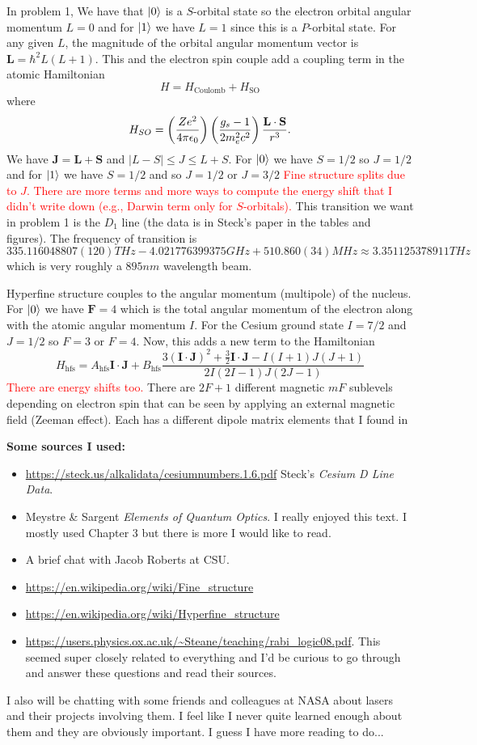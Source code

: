 \documentclass[12pt]{article} %
\begin{document}
In problem 1, We have that $\ket{0}$ is a $S$-orbital state so the electron orbital angular momentum $L=0$ and for $\ket{1}$ we have $L=1$ since this is a $P$-orbital state. For any given $L$, the magnitude of the orbital angular momentum vector is $\mathbf{L}=\hbar^2 L(L+1)$. This and the electron spin couple add a coupling term in the atomic Hamiltonian
\[
H=H_{\textrm{Coulomb}}+H_{\textrm{SO}}
\]
where
\[
H_{SO} = \left(\frac{Ze^2}{4 \pi \epsilon_0} \right) \left(\frac{g_s-1}{2m_e^2c^2} \right)\frac{\bf{L}\cdot \bf{S}}{r^3}.
\]
We have $\mathbf{J} = \mathbf{L}+\mathbf{S}$ and $|L-S|\leq J \leq L+S$. For $\ket{0}$ we have $S=1/2$ so $J=1/2$ and for $\ket{1}$ we have $S=1/2$ and so $J=1/2$ or $J=3/2$ \textcolor{red}{Fine structure splits due to $J$. There are more terms and more ways to compute the energy shift that I didn't write down (e.g., Darwin term only for $S$-orbitals).} This transition we want in problem 1 is the $D_1$ line (the data is in Steck's paper in the tables and figures). The frequency of transition is 
\[
335.116048807(120)\si{THz}- 4.021776399375\si{GHz} + 510.860(34)\si{MHz} \approx 3.351125378911\si{THz}
\]
which is very roughly a $895\si{nm}$ wavelength beam.

Hyperfine structure couples to the angular momentum (multipole) of the nucleus. For $\ket{0}$ we have $\mathbf{F}=4$ which is the total  angular momentum of the electron along with the atomic angular momentum $I$. For the Cesium ground state $I=7/2$ and $J=1/2$ so $F=3$ or $F=4$. Now, this adds a new term to the Hamiltonian
\[
H_{\textrm{hfs}} = A_{\textrm{hfs}} \mathbf{I}\cdot \mathbf{J} + B_{\textrm{hfs}} \frac{3(\mathbf{I}\cdot \mathbf{J})^2 + \frac{3}{2} \mathbf{I}\cdot \mathbf{J} - I(I+1)J(J+1)}{2I(2I-1)J(2J-1)}
\]
\textcolor{red}{There are energy shifts too.} There are $2F+1$ different magnetic $mF$ sublevels depending on electron spin that can be seen by applying an external magnetic field (Zeeman effect). Each has a different dipole matrix elements that I found in 


\noindent \textbf{Some sources I used:}
\begin{itemize}
\item \url{https://steck.us/alkalidata/cesiumnumbers.1.6.pdf} Steck's \emph{Cesium D Line Data}.
\item Meystre \& Sargent \emph{Elements of Quantum Optics}. I really enjoyed this text. I mostly used Chapter 3 but there is more I would like to read.
\item A brief chat with Jacob Roberts at CSU.
\item \url{https://en.wikipedia.org/wiki/Fine_structure}
\item \url{https://en.wikipedia.org/wiki/Hyperfine_structure}
\item \url{https://users.physics.ox.ac.uk/~Steane/teaching/rabi_logic08.pdf}. This seemed super closely related to everything and I'd be curious to go through and answer these questions and read their sources.
\end{itemize}

I also will be chatting with some friends and colleagues at NASA about lasers and their projects involving them. I feel like I never quite learned enough about them and they are obviously important. I guess I have more reading to do...
\end{document}
